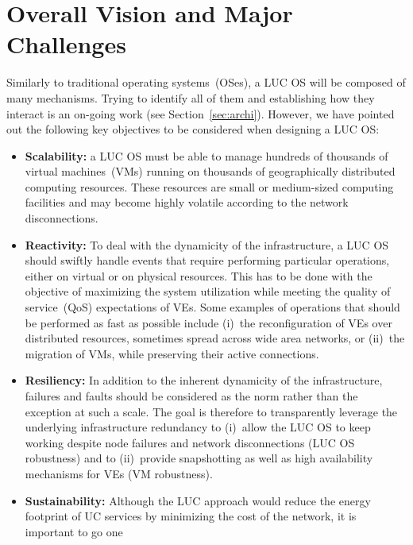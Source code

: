 \section{Overall Vision and Major Challenges\label{sec:challenges}}

Similarly to traditional operating systems~(OSes), a LUC OS will be composed of
many mechanisms. Trying to identify all of them and establishing how they
interact is an on-going work (see Section~\ref{sec:archi}). However,
we have pointed out the following
key objectives to be considered when designing a LUC OS:

\begin{itemize} 
\item \textbf{Scalability:} a LUC OS must be able to manage hundreds of
  thousands of virtual machines~(VMs) running on thousands of 
  geographically distributed computing resources.  These resources are small or
  medium-sized computing facilities and may become highly volatile according to the network disconnections.  
\item \textbf{Reactivity:} To deal with the dynamicity of the infrastructure, a LUC OS
  should swiftly handle events that require performing particular
  operations, either on virtual or on physical resources. This has to be done with the
  objective of maximizing the system utilization while meeting the quality of service~(QoS) expectations of VEs. 
  Some examples of operations that should be performed as fast as possible include (i)~the reconfiguration
  of VEs over distributed resources, sometimes spread across wide area networks, or (ii)~the migration of VMs, 
  while preserving their active connections.
\item \textbf{Resiliency:} In addition to the inherent dynamicity of the
  infrastructure, failures and faults should be considered as the norm rather than the
exception at such a scale. The goal is therefore to transparently leverage the
underlying infrastructure redundancy to (i)~allow the LUC OS to keep
working despite node failures and network disconnections (LUC OS robustness) and to (ii)~provide
snapshotting as well as high availability mechanisms for VEs (VM robustness).
\item \textbf{Sustainability:} Although the LUC approach would reduce the energy
footprint of UC services by minimizing the cost of the network, 
it is important to go one

\end{itemize}
